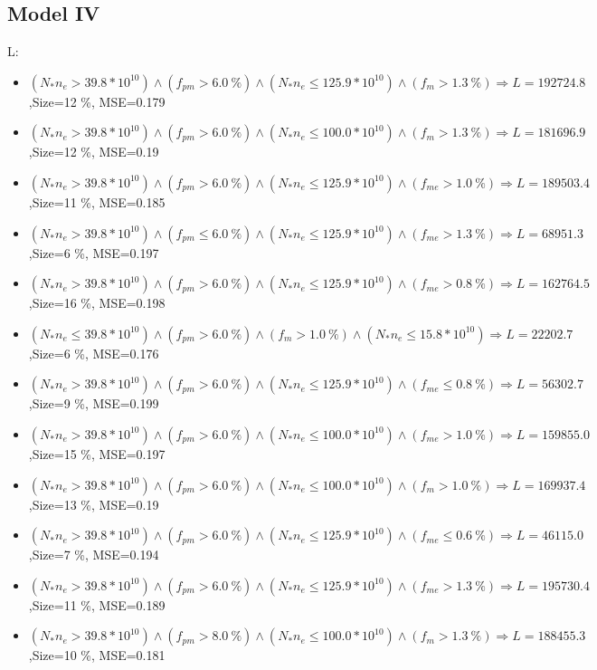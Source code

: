 \documentclass[numbered]{CSL}
\begin{document}
\subsection{Model IV}
L:
\begin{itemize}
\item $(N_* n_e > 39.8 * 10^{10}) \land (f_{pm} > 6.0~\%) \land (N_* n_e \leq 125.9 * 10^{10}) \land (f_m > 1.3~\%) \Rightarrow L = 192724.8$,\hfill Size=12 \%, MSE=0.179
\item $(N_* n_e > 39.8 * 10^{10}) \land (f_{pm} > 6.0~\%) \land (N_* n_e \leq 100.0 * 10^{10}) \land (f_m > 1.3~\%) \Rightarrow L = 181696.9$,\hfill Size=12 \%, MSE=0.19
\item $(N_* n_e > 39.8 * 10^{10}) \land (f_{pm} > 6.0~\%) \land (N_* n_e \leq 125.9 * 10^{10}) \land (f_{me} > 1.0~\%) \Rightarrow L = 189503.4$,\hfill Size=11 \%, MSE=0.185
\item $(N_* n_e > 39.8 * 10^{10}) \land (f_{pm} \leq 6.0~\%) \land (N_* n_e \leq 125.9 * 10^{10}) \land (f_{me} > 1.3~\%) \Rightarrow L = 68951.3$,\hfill Size=6 \%, MSE=0.197
\item $(N_* n_e > 39.8 * 10^{10}) \land (f_{pm} > 6.0~\%) \land (N_* n_e \leq 125.9 * 10^{10}) \land (f_{me} > 0.8~\%) \Rightarrow L = 162764.5$,\hfill Size=16 \%, MSE=0.198
\item $(N_* n_e \leq 39.8 * 10^{10}) \land (f_{pm} > 6.0~\%) \land (f_m > 1.0~\%) \land (N_* n_e \leq 15.8 * 10^{10}) \Rightarrow L = 22202.7$,\hfill Size=6 \%, MSE=0.176
\item $(N_* n_e > 39.8 * 10^{10}) \land (f_{pm} > 6.0~\%) \land (N_* n_e \leq 125.9 * 10^{10}) \land (f_{me} \leq 0.8~\%) \Rightarrow L = 56302.7$,\hfill Size=9 \%, MSE=0.199
\item $(N_* n_e > 39.8 * 10^{10}) \land (f_{pm} > 6.0~\%) \land (N_* n_e \leq 100.0 * 10^{10}) \land (f_{me} > 1.0~\%) \Rightarrow L = 159855.0$,\hfill Size=15 \%, MSE=0.197
\item $(N_* n_e > 39.8 * 10^{10}) \land (f_{pm} > 6.0~\%) \land (N_* n_e \leq 100.0 * 10^{10}) \land (f_m > 1.0~\%) \Rightarrow L = 169937.4$,\hfill Size=13 \%, MSE=0.19
\item $(N_* n_e > 39.8 * 10^{10}) \land (f_{pm} > 6.0~\%) \land (N_* n_e \leq 125.9 * 10^{10}) \land (f_{me} \leq 0.6~\%) \Rightarrow L = 46115.0$,\hfill Size=7 \%, MSE=0.194
\item $(N_* n_e > 39.8 * 10^{10}) \land (f_{pm} > 6.0~\%) \land (N_* n_e \leq 125.9 * 10^{10}) \land (f_{me} > 1.3~\%) \Rightarrow L = 195730.4$,\hfill Size=11 \%, MSE=0.189
\item $(N_* n_e > 39.8 * 10^{10}) \land (f_{pm} > 8.0~\%) \land (N_* n_e \leq 100.0 * 10^{10}) \land (f_m > 1.3~\%) \Rightarrow L = 188455.3$,\hfill Size=10 \%, MSE=0.181

\end{itemize}
\end{document}
